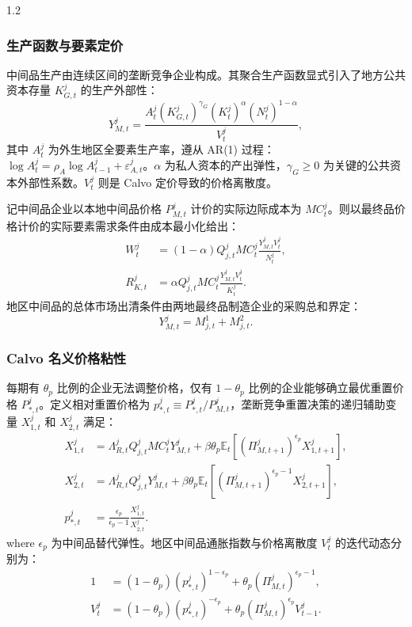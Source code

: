 \documentclass[12pt,UTF8]{ctexart}
\newcommand{\E}{\mathbb{E}}
\begin{document}
\begin{spacing}{1.2}
		\subsubsection{生产函数与要素定价}
		
		中间品生产由连续区间的垄断竞争企业构成。其聚合生产函数显式引入了地方公共资本存量 $K_{G,t}^j$ 的生产外部性：
		\begin{equation}
			Y_{M,t}^j=\frac{A_t^j(K_{G,t}^j)^{\gamma_G}(K_t^j)^{\alpha}(N_t^j)^{1-\alpha}}{V_t^j},
			\label{eq:intermediate_production}
		\end{equation}
		其中 $A_t^j$ 为外生地区全要素生产率，遵从 AR(1) 过程：$\log A_t^j = \rho_A \log A_{t-1}^j + \varepsilon_{A,t}^j$。$\alpha$ 为私人资本的产出弹性，$\gamma_G \ge 0$ 为关键的公共资本外部性系数。$V_t^j$ 则是 Calvo 定价导致的价格离散度。
		
		记中间品企业以本地中间品价格 $P_{M,t}^j$ 计价的实际边际成本为 $MC_t^j$。则以最终品价格计价的实际要素需求条件由成本最小化给出：
		\begin{align}
			W_t^j &=(1-\alpha)Q_{j,t}^jMC_t^j\frac{Y_{M,t}^jV_t^j}{N_t^j}, \label{eq:wage_demand}\\
			R_{K,t}^j &=\alpha Q_{j,t}^jMC_t^j\frac{Y_{M,t}^jV_t^j}{K_t^j}.
			\label{eq:rk_demand}
		\end{align}
		地区中间品的总体市场出清条件由两地最终品制造企业的采购总和界定：
		\begin{equation}
			Y_{M,t}^j=M_{j,t}^1+M_{j,t}^2.
			\label{eq:intermediate_clearing}
		\end{equation}
		
		\subsubsection{Calvo 名义价格粘性}
		
		每期有 $\theta_p$ 比例的企业无法调整价格，仅有 $1-\theta_p$ 比例的企业能够确立最优重置价格 $P_{*,t}^j$。定义相对重置价格为 $p_{*,t}^j \equiv P_{*,t}^j / P_{M,t}^j$，垄断竞争重置决策的递归辅助变量 $X_{1,t}^j$ 和 $X_{2,t}^j$ 满足：
		\begin{align}
			X_{1,t}^j &=\Lambda_{R,t}^jQ_{j,t}^jMC_t^jY_{M,t}^j
			+\beta\theta_p\E_t\left[(\Pi_{M,t+1}^j)^{\epsilon_p}X_{1,t+1}^j\right], \label{eq:x1}\\
			X_{2,t}^j &=\Lambda_{R,t}^jQ_{j,t}^jY_{M,t}^j
			+\beta\theta_p\E_t\left[(\Pi_{M,t+1}^j)^{\epsilon_p-1}X_{2,t+1}^j\right], \label{eq:x2}\\
			p_{*,t}^j &=\frac{\epsilon_p}{\epsilon_p-1}\frac{X_{1,t}^j}{X_{2,t}^j}.
			\label{eq:pstar}
		\end{align}
		where $\epsilon_p$ 为中间品替代弹性。地区中间品通胀指数与价格离散度 $V_t^j$ 的迭代动态分别为：
		\begin{align}
			1 &=(1-\theta_p)(p_{*,t}^j)^{1-\epsilon_p} +\theta_p(\Pi_{M,t}^j)^{\epsilon_p-1}, \label{eq:calvo_index}\\
			V_t^j &=(1-\theta_p)(p_{*,t}^j)^{-\epsilon_p} +\theta_p(\Pi_{M,t}^j)^{\epsilon_p}V_{t-1}^j.
			\label{eq:dispersion}
		\end{align}
		

\end{spacing}
\end{document}
